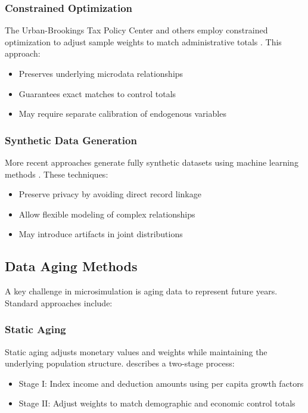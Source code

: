 \subsubsection{Constrained Optimization}

The Urban-Brookings Tax Policy Center and others employ constrained optimization to adjust sample weights to match administrative totals \cite{OHare2000}. This approach:
\begin{itemize}
    \item Preserves underlying microdata relationships
    \item Guarantees exact matches to control totals
    \item May require separate calibration of endogenous variables
\end{itemize}

\subsubsection{Synthetic Data Generation}

More recent approaches generate fully synthetic datasets using machine learning methods \cite{Benedetto2018}. These techniques:
\begin{itemize}
    \item Preserve privacy by avoiding direct record linkage
    \item Allow flexible modeling of complex relationships
    \item May introduce artifacts in joint distributions
\end{itemize}

\subsection{Data Aging Methods}

A key challenge in microsimulation is aging data to represent future years. Standard approaches include:

\subsubsection{Static Aging}

Static aging adjusts monetary values and weights while maintaining the underlying population structure. \cite{OHare2000} describes a two-stage process:
\begin{itemize}
    \item Stage I: Index income and deduction amounts using per capita growth factors
    \item Stage II: Adjust weights to match demographic and economic control totals
\end{itemize}

